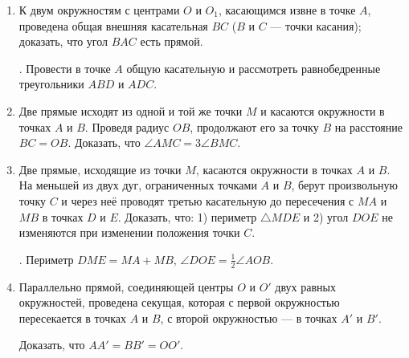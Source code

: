 \documentclass[oneside]{book}
\begin{document}
\begin{enumerate}[resume]
 \item
К двум окружностям с центрами $O$ и $O_1$, касающимся извне в точке $A$, проведена общая внешняя касательная $BC$ ($B$ и $C$ — точки касания);
доказать, что угол $BAC$ есть прямой.

.
Провести в точке $A$ общую касательную и рассмотреть равнобедренные треугольники $ABD$ и $ADC$.

 \item
Две прямые исходят из одной и той же точки $M$ и касаются окружности в точках $A$ и $B$.
Проведя радиус $OB$, продолжают его за точку $B$ на расстояние $BC=OB$.
Доказать, что $\angle AMC=3\angle BMC$.

 \item
Две прямые, исходящие из точки $M$, касаются окружности в точках $A$ и $B$.
На меньшей из двух дуг, ограниченных точками $A$ и $B$, берут произвольную точку $C$ и через неё проводят третью касательную до пересечения с $MA$ и $MB$ в точках $D$ и $E$.
Доказать, что:
1) периметр $\triangle MDE$ и 2) угол $DOE$ не изменяются при изменении положения точки $C$.

.
Периметр $DME=MA+MB$, $\angle DOE=\tfrac12 \angle AOB$.

 \item
Параллельно прямой, соединяющей центры $O$ и $O'$ двух равных окружностей, проведена секущая, которая с первой окружностью пересекается в точках $A$ и $B$, с второй окружностью — в точках $A'$ и $B'$.

Доказать, что $AA' = BB' = OO'$. %

\end{enumerate}

\begin{center}
\end{center}
\end{document}
